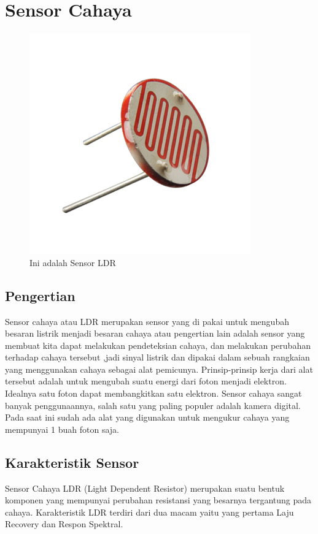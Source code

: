 \section{Sensor Cahaya}
\begin{figure}[!htbp]
  \centering
  \includegraphics[width=.75\textwidth]{figures/Arduino/LDR.jpg}
  \caption{Ini adalah Sensor LDR}\label{fig:ldr}
\end{figure}

\subsection{Pengertian}
Sensor cahaya atau LDR merupakan sensor yang di pakai untuk mengubah besaran listrik menjadi besaran cahaya atau pengertian lain adalah  sensor yang membuat kita dapat melakukan pendeteksian cahaya, dan melakukan perubahan terhadap cahaya tersebut ,jadi sinyal listrik dan dipakai dalam sebuah rangkaian yang menggunakan cahaya sebagai alat pemicunya. Prinsip-prinsip kerja dari alat tersebut adalah untuk mengubah suatu energi dari foton menjadi elektron. Idealnya satu foton dapat membangkitkan satu elektron. Sensor cahaya sangat banyak penggunaannya, salah satu yang paling populer adalah kamera digital. Pada saat ini sudah ada alat yang digunakan untuk mengukur cahaya yang mempunyai 1 buah foton saja.

\subsection{Karakteristik Sensor}
Sensor Cahaya LDR (Light Dependent Resistor) merupakan suatu bentuk komponen yang mempunyai perubahan resistansi yang besarnya tergantung pada cahaya. Karakteristik LDR terdiri dari dua macam yaitu yang pertama Laju Recovery dan Respon Spektral.

